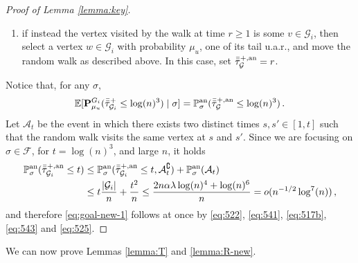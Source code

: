\documentclass[11pt,oneside]{amsart}
\numberwithin{equation}{section}  %
\theoremstyle{plain}
\newcommand{\E}{\mathbb{E}}
\newcommand{\p}{\mathbb{P}}
\newcommand{\quench}{\mathbf{P}}
\newcommand{\pan}{\p^{\textup{an}}}
\newcommand{\gates}{\mathcal{G}}
\begin{document}
\begin{proof}[Proof of Lemma \ref{lemma:key}]
\begin{enumerate}
			\item[(iv)] if instead the vertex visited by the walk at time $r\ge 1$ is some $v\in\gates_i$, then select a vertex $w\in\gates_i$ with probability $\mu_u$, one of its tail u.a.r., and move the random walk as described above. 
            In this case, set $\bar{\bar{\tau}}_{\gates}^{+,\rm an}=r$.
		\end{enumerate}
		Notice that, for any $\sigma$,
		\begin{equation}\label{eq:543}
			\E[\quench^{G_i}_{{\mu_u}} (\bar{\bar{\tau}}_{\gates_i}^+\le \log(n)^3)\mid \sigma]=\pan_{\sigma}(\bar{\bar{\tau}}_{\gates}^{+,\rm an}\le \log(n)^3 )\,.
		\end{equation}
		              		Let $\mathcal{A}_t$ be the event in which there exists two distinct times $s,s'\in[1,t]$ such that the random walk visits the same vertex at $s$ and $s'$.
        Since we are focusing on $\sigma\in\mathcal{F}$, for $t= \log(n)^3$, and large $n$, it holds
		\begin{equation}\label{eq:525}
			\begin{split}
				\pan_{\sigma}(\bar{\bar{\tau}}_{{\gates_i}}^{+,\rm an}\le t)&\le
                \pan_{\sigma}(\bar{\bar{\tau}}_{{\gates_i}}^{+,\rm an}\le t, \mathcal{A}_t^\complement)+\pan_{\sigma}(\mathcal{A}_t)\\
				&\le t\frac{|\gates_i|}{n}+ \frac{t^2}n
				\le \frac{2n\alpha \lambda\log(n)^4+\log(n)^6}{n} =o(n^{-1/2}\log^7(n))\,,
			\end{split}
		\end{equation}
 		and therefore \eqref{eq:goal-new-1} follows at once by \eqref{eq:522}, \eqref{eq:541}, \eqref{eq:517b}, \eqref{eq:543} and \eqref{eq:525}.       
\end{proof}
We can now prove Lemmas \ref{lemma:T} and \ref{lemma:R-new}.
\end{document}
